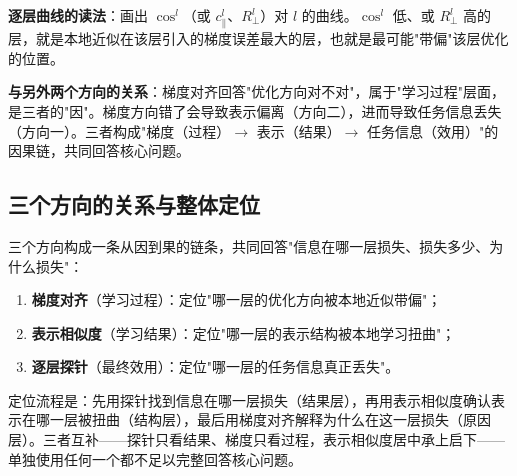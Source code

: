 \documentclass[journal,12pt,onecolumn]{IEEEtran}
\begin{document}
\textbf{逐层曲线的读法}：画出 $\cos^l$（或 $c^l_{\parallel}$、$R^l_{\perp}$）对 $l$ 的曲线。$\cos^l$ 低、或 $R^l_{\perp}$ 高的层，就是本地近似在该层引入的梯度误差最大的层，也就是最可能"带偏"该层优化的位置。

\textbf{与另外两个方向的关系}：梯度对齐回答"优化方向对不对"，属于"学习过程"层面，是三者的"因"。梯度方向错了会导致表示偏离（方向二），进而导致任务信息丢失（方向一）。三者构成"梯度（过程）$\to$ 表示（结果）$\to$ 任务信息（效用）"的因果链，共同回答核心问题。

\subsection{三个方向的关系与整体定位}

三个方向构成一条从因到果的链条，共同回答"信息在哪一层损失、损失多少、为什么损失"：

\begin{enumerate}[leftmargin=1.5em,itemsep=0pt]
\item \textbf{梯度对齐}（学习过程）：定位"哪一层的优化方向被本地近似带偏"；
\item \textbf{表示相似度}（学习结果）：定位"哪一层的表示结构被本地学习扭曲"；
\item \textbf{逐层探针}（最终效用）：定位"哪一层的任务信息真正丢失"。
\end{enumerate}

定位流程是：先用探针找到信息在哪一层损失（结果层），再用表示相似度确认表示在哪一层被扭曲（结构层），最后用梯度对齐解释为什么在这一层损失（原因层）。三者互补——探针只看结果、梯度只看过程，表示相似度居中承上启下——单独使用任何一个都不足以完整回答核心问题。



\end{document}

